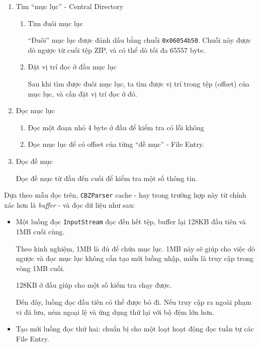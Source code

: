 \documentclass[
]{article}
\providecommand{\tightlist}{%
  \setlength{\itemsep}{0pt}\setlength{\parskip}{0pt}}
\begin{document}
\begin{enumerate}
\def\labelenumi{\arabic{enumi}.}
\item
  Tìm ``mục lục'' - Central Directory

  \begin{enumerate}
  \def\labelenumii{\arabic{enumii}.}
  \item
    Tìm đuôi mục lục

    ``Đuôi'' mục lục được đánh dấu bằng chuỗi \texttt{0x06054b50}. Chuỗi
    này được dò ngược từ cuối tệp ZIP, và có thể dò tối đa 65557 byte.
  \item
    Đặt vị trí đọc ở đầu mục lục

    Sau khi tìm được đuôi mục lục, ta tìm được vị trí trong tệp (offset)
    của mục lục, và cần đặt vị trí đọc ở đó.
  \end{enumerate}
\item
  Đọc mục lục

  \begin{enumerate}
  \def\labelenumii{\arabic{enumii}.}
  \tightlist
  \item
    Đọc một đoạn nhỏ 4 byte ở đầu để kiểm tra có lỗi không
  \item
    Đọc mục lục để có offset của từng ``đề mục'' - File Entry.
  \end{enumerate}
\item
  Đọc đề mục

  Đọc đề mục từ đầu đến cuối để kiểm tra một số thông tin.
\end{enumerate}

Dựa theo mẫu đọc trên, \texttt{CBZParser} cache - hay trong trường hợp
này từ chính xác hơn là \emph{buffer} - và đọc dữ liệu như sau:

\begin{itemize}
\item
  Một luồng đọc \texttt{InputStream} đọc đến hết tệp, buffer lại 128KB
  đầu tiên và 1MB cuối cùng.

  Theo kinh nghiệm, 1MB là đủ để chứa mục lục. 1MB này sẽ giúp cho việc
  dò ngược và đọc mục lục không cần tạo mới luồng nhập, miễn là truy cập
  trong vòng 1MB cuối.

  128KB ở đầu giúp cho một số kiểm tra chạy được.

  Đến đây, luồng đọc đầu tiên có thể được bỏ đi. Nếu truy cập ra ngoài
  phạm vi đã lưu, ném ngoại lệ và ứng dụng thử lại với bộ đệm lớn hơn.
\item
  Tạo mới luồng đọc thứ hai: chuẩn bị cho một loạt hoạt động đọc tuần tự
  các File Entry.
\end{itemize}
\end{document}
